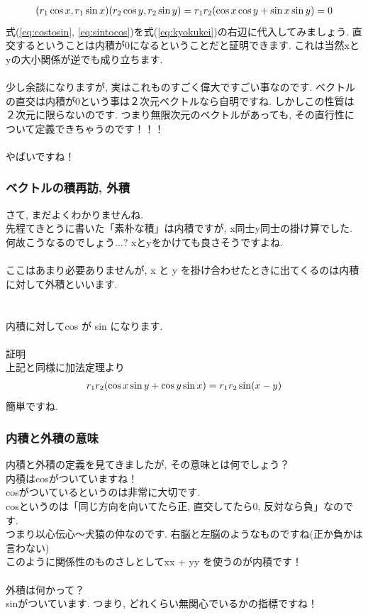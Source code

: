 \documentclass[11pt,a4paper]{jreport}
\begin{document}
\begin{eqnarray}
(\mathstrut r_1\cos x, \mathstrut r_1\sin x)(\mathstrut r_2\cos y, \mathstrut r_2\sin y) = \mathstrut r_1\mathstrut r_2(\cos x\cos y + \sin x\sin y) = 0
\label{eq:kyokukei}
\end{eqnarray}
式(\ref{eq:costosin}, \ref{eq:sintocos})を式(\ref{eq:kyokukei})の右辺に代入してみましょう. 直交するということは内積が0になるということだと証明できます. これは当然xとyの大小関係が逆でも成り立ちます. \\
\\
少し余談になりますが, 実はこれものすごく偉大ですごい事なのです. ベクトルの直交は内積が0という事は２次元ベクトルなら自明ですね. しかしこの性質は２次元に限らないのです. つまり無限次元のベクトルがあっても, その直行性について定義できちゃうのです！！！\\
\\
やばいですね！\\


\subsubsection{ベクトルの積再訪, 外積}
さて, まだよくわかりませんね. \\
先程てきとうに書いた「素朴な積」は内積ですが, x同士y同士の掛け算でした.\\
何故こうなるのでしょう...? xとyをかけても良さそうですよね.\\
\\
ここはあまり必要ありませんが, x と y を掛け合わせたときに出てくるのは内積に対して外積といいます.\\
\\
\\
内積に対してcos が sin になります.
\\
\\
証明\\
上記と同様に加法定理より\\
\begin{eqnarray}
\mathstrut r_1\mathstrut r_2(\cos x\sin y + \cos y\sin x) = \mathstrut r_1\mathstrut r_2\sin (x-y)
\end{eqnarray}
簡単ですね.


\subsubsection{内積と外積の意味}
内積と外積の定義を見てきましたが, その意味とは何でしょう？\\
内積はcosがついていますね！\\
cosがついているというのは非常に大切です.\\
cosというのは「同じ方向を向いてたら正, 直交してたら0, 反対なら負」なのです.\\
つまり以心伝心～犬猿の仲なのです. 右脳と左脳のようなものですね(正か負かは言わない)\\
このように関係性のものさしとしてxx + yy を使うのが内積です！\\
\\
外積は何かって？\\
sinがついています. つまり, どれくらい無関心でいるかの指標ですね！
\end{document}
